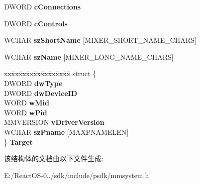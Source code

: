 \begin{DoxyCompactItemize}
D\+W\+O\+RD {\bfseries c\+Connections}
\item 
\mbox{\label{structtag_m_i_x_e_r_l_i_n_e_w_a5aef2f4431ab2e019a1defc3fe6f85db}} 
D\+W\+O\+RD {\bfseries c\+Controls}
\item 
\mbox{\label{structtag_m_i_x_e_r_l_i_n_e_w_afcda477ae192bbf571dd9757722243fd}} 
W\+C\+H\+AR {\bfseries sz\+Short\+Name} \mbox{[}M\+I\+X\+E\+R\+\_\+\+S\+H\+O\+R\+T\+\_\+\+N\+A\+M\+E\+\_\+\+C\+H\+A\+RS\mbox{]}
\item 
\mbox{\label{structtag_m_i_x_e_r_l_i_n_e_w_aa9b27ef6b5d493c13603dc7e85ea7429}} 
W\+C\+H\+AR {\bfseries sz\+Name} \mbox{[}M\+I\+X\+E\+R\+\_\+\+L\+O\+N\+G\+\_\+\+N\+A\+M\+E\+\_\+\+C\+H\+A\+RS\mbox{]}
\item 
\mbox{\label{structtag_m_i_x_e_r_l_i_n_e_w_a42bea6f49bd035713d3b1e8d17dbccf9}} 
\begin{tabbing}
xx\=xx\=xx\=xx\=xx\=xx\=xx\=xx\=xx\=\kill
struct \{\\
\>DWORD {\bfseries dwType}\\
\>DWORD {\bfseries dwDeviceID}\\
\>WORD {\bfseries wMid}\\
\>WORD {\bfseries wPid}\\
\>MMVERSION {\bfseries vDriverVersion}\\
\>WCHAR {\bfseries szPname} \mbox{[}MAXPNAMELEN\mbox{]}\\
\} {\bfseries Target}\\

\end{tabbing}\end{DoxyCompactItemize}


该结构体的文档由以下文件生成\+:\begin{DoxyCompactItemize}
\item 
E\+:/\+React\+O\+S-\/0../sdk/include/psdk/mmsystem.\+h\end{DoxyCompactItemize}
